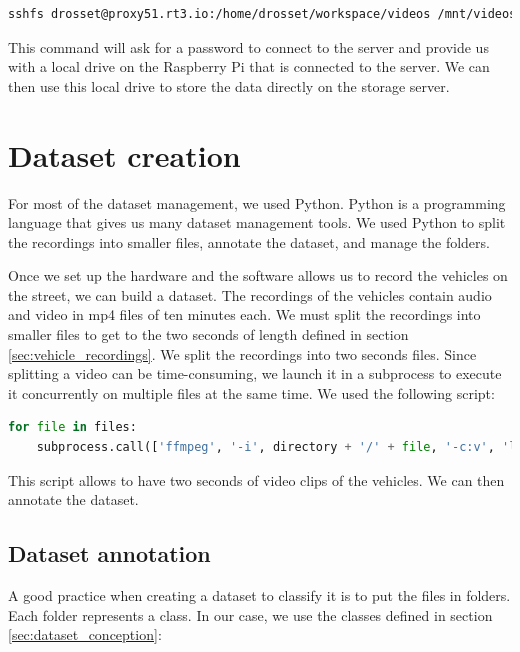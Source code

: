 \begin{lstlisting}[language=bash]
    sshfs drosset@proxy51.rt3.io:/home/drosset/workspace/videos /mnt/videos -p 33838
\end{lstlisting}

This command will ask for a password to connect to the server and provide us with a local drive on the Raspberry Pi that is connected to the server. We can then use this local drive to store the data directly on the storage server.

\section{Dataset creation}

For most of the dataset management, we used Python. Python is a programming language that gives us many dataset management tools. We used Python to split the recordings into smaller files, annotate the dataset, and manage the folders.

Once we set up the hardware and the software allows us to record the vehicles on the street, we can build a dataset. The recordings of the vehicles contain audio and video in mp4 files of ten minutes each. We must split the recordings into smaller files to get to the two seconds of length defined in section \ref{sec:vehicle_recordings}. We split the recordings into two seconds files. Since splitting a video can be time-consuming, we launch it in a subprocess to execute it concurrently on multiple files at the same time. We used the following script:

\begin{lstlisting}[language=python]
for file in files:
    subprocess.call(['ffmpeg', '-i', directory + '/' + file, '-c:v', 'libx264', '-crf', '22', '-map', '0', '-segment_time', time, '-reset_timestamps', '1', '-g', '30', '-sc_threshold', '0', '-force_key_frames', 'expr:gte(t,n_forced*'+str(time)+')', '-f', 'segment', directory[:-1]+'-2sec/' + file + '%05d.mp4'])
\end{lstlisting}

This script allows to have two seconds of video clips of the vehicles. We can then annotate the dataset.

\subsection{Dataset annotation}

A good practice when creating a dataset to classify it is to put the files in folders. Each folder represents a class. In our case, we use the classes defined in section \ref{sec:dataset_conception}: 

